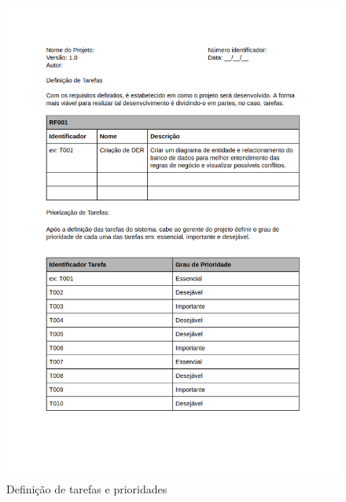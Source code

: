 \documentclass[	DIV=calc,%
							paper=a4,%
							fontsize=12pt,%
							onecolumn]{scrartcl}	 					%
\begin{document}
\begin{figure}
	\centering
	\includegraphics[width=\textwidth]{3.png}
	\caption{Definição de tarefas e prioridades}
	\label{Figura 3}
\end{figure}
\end{document}
